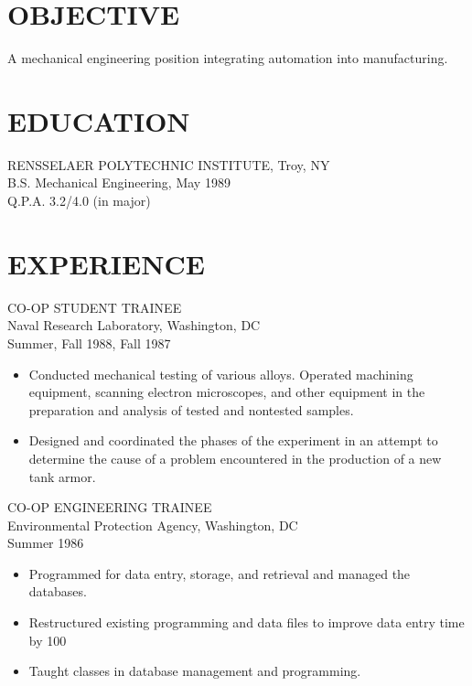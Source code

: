                                              
\begin{resume}
                                               
 
\section{OBJECTIVE}
   A mechanical engineering  position  integrating  automation  into 
manufacturing. 
 
\section{EDUCATION} 
 \noindent RENSSELAER POLYTECHNIC INSTITUTE, Troy, NY \\
B.S. Mechanical Engineering, May 1989 \\
Q.P.A. 3.2/4.0 (in major) 
 
\section{EXPERIENCE} 
 CO-OP STUDENT TRAINEE \\
Naval Research Laboratory, Washington, DC \\
Summer, Fall 1988, Fall 1987 
\vspace{0.2in}
   \begin{itemize} \itemsep -2pt  %
   \item Conducted  mechanical  testing  of  various  alloys. Operated 
    machining equipment, scanning electron microscopes, and other 
    equipment  in  the  preparation  and  analysis  of tested and 
    nontested samples. 
   \item Designed and coordinated the phases of the experiment  in  an 
    attempt  to  determine  the cause of a problem encountered in 
    the production of a new tank armor. 
 \end{itemize}

CO-OP ENGINEERING TRAINEE \\
Environmental Protection Agency, Washington, DC \\ 
Summer 1986 
\vspace{0.2in}
 \begin{itemize} \itemsep -2pt
   \item Programmed for data entry, storage, and retrieval and managed 
    the databases. 
  \item  Restructured existing programming and data files  to  improve 
    data entry time by 100%
  \item Taught classes in database management and programming. 
\end{itemize} 


\end{resume}
